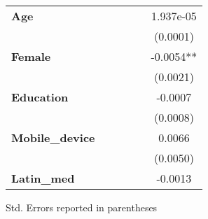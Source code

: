 \begin{center}
\begin{tabular}{lccccc}
\textbf{Age}                                    &                  &                  &                  &                  &    1.937e-05      \\
\textbf{ }                                      &                  &                  &                  &                  &     (0.0001)      \\
\textbf{Female}                                 &                  &                  &                  &                  &    -0.0054**      \\
\textbf{ }                                      &                  &                  &                  &                  &     (0.0021)      \\
\textbf{Education}                              &                  &                  &                  &                  &     -0.0007       \\
\textbf{ }                                      &                  &                  &                  &                  &     (0.0008)      \\
\textbf{Mobile\_device}                         &                  &                  &                  &                  &      0.0066       \\
\textbf{ }                                      &                  &                  &                  &                  &     (0.0050)      \\
\textbf{Latin\_med}                             &                  &                  &                  &                  &     -0.0013       \\
\bottomrule
\end{tabular}
\end{center}

Std. Errors reported in parentheses